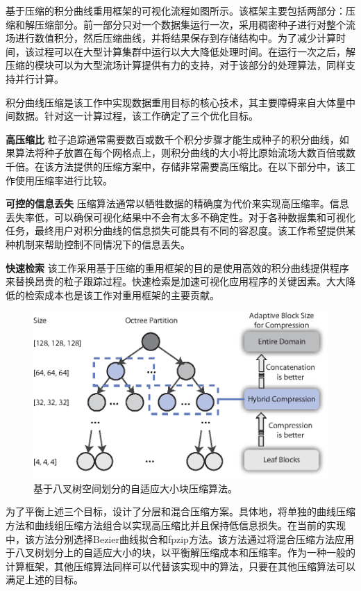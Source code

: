 基于压缩的积分曲线重用框架的可视化流程如图所示。该框架主要包括两部分：压缩和解压缩部分。前一部分只对一个数据集运行一次，采用稠密种子进行对整个流场进行数值积分，然后压缩曲线，并将结果保存到存储结构中。为了减少计算时间，该过程可以在大型计算集群中运行以大大降低处理时间。在运行一次之后，解压缩的模块可以为大型流场计算提供有力的支持，对于该部分的处理算法，同样支持并行计算。

积分曲线压缩是该工作中实现数据重用目标的核心技术，其主要障碍来自大体量中间数据。针对这一计算过程，该工作确定了三个优化目标。

{\bf 高压缩比}\quad
粒子追踪通常需要数百或数千个积分步骤才能生成种子的积分曲线，如果算法将种子放置在每个网格点上，则积分曲线的大小将比原始流场大数百倍或数千倍。在该方法提供的压缩方案中，存储非常需要高压缩比。在以下部分中，该工作使用压缩率进行比较。

{\bf 可控的信息丢失}\quad
压缩算法通常以牺牲数据的精确度为代价来实现高压缩率。信息丢失率低，可以确保可视化结果中不会有太多不确定性。对于各种数据集和可视化任务，最终用户对积分曲线的信息损失可能具有不同的容忍度。该工作希望提供某种机制来帮助控制不同情况下的信息丢失。

{\bf 快速检索}\quad
该工作采用基于压缩的重用框架的目的是使用高效的积分曲线提供程序来替换昂贵的粒子跟踪过程。快速检索是加速可视化应用程序的关键因素。大大降低的检索成本也是该工作对重用框架的主要贡献。

\begin{figure}[htbp]
  \centering
  \includegraphics[width=.75\columnwidth]{image/linecompress/recursion.eps}
  \caption{
  基于八叉树空间划分的自适应大小块压缩算法。\parencite{hong2017compression}
  }
  \label{fig:recursion}
\end{figure}

为了平衡上述三个目标，设计了分层和混合压缩方案。具体地，将单独的曲线压缩方法和曲线组压缩方法组合以实现高压缩比并且保持低信息损失。在当前的实现中，该方法分别选择Bezier曲线拟合和fpzip方法。该方法通过将混合压缩方法应用于八叉树划分上的自适应大小的块，以平衡解压缩成本和压缩率。作为一种一般的计算框架，其他压缩算法同样可以代替该实现中的算法，只要在其他压缩算法可以满足上述的目标。

